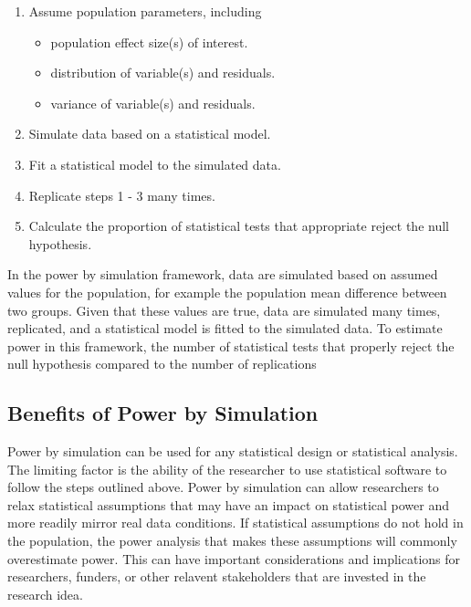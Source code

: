 \documentclass[man]{apa6}
\providecommand{\tightlist}{%
  \setlength{\itemsep}{0pt}\setlength{\parskip}{0pt}}
\begin{document}
\begin{enumerate}
\def\labelenumi{\arabic{enumi}.}
\tightlist
\item
  Assume population parameters, including

  \begin{itemize}
  \tightlist
  \item
    population effect size(s) of interest.
  \item
    distribution of variable(s) and residuals.
  \item
    variance of variable(s) and residuals.
  \end{itemize}
\item
  Simulate data based on a statistical model.
\item
  Fit a statistical model to the simulated data.
\item
  Replicate steps 1 - 3 many times.
\item
  Calculate the proportion of statistical tests that appropriate reject the null hypothesis.
\end{enumerate}

In the power by simulation framework, data are simulated based on assumed values for the population, for example the population mean difference between two groups. Given that these values are true, data are simulated many times, replicated, and a statistical model is fitted to the simulated data. To estimate power in this framework, the number of statistical tests that properly reject the null hypothesis compared to the number of replications

\hypertarget{benefits-of-power-by-simulation}{%
\subsection{Benefits of Power by Simulation}\label{benefits-of-power-by-simulation}}

Power by simulation can be used for any statistical design or statistical analysis. The limiting factor is the ability of the researcher to use statistical software to follow the steps outlined above. Power by simulation can allow researchers to relax statistical assumptions that may have an impact on statistical power and more readily mirror real data conditions. If statistical assumptions do not hold in the population, the power analysis that makes these assumptions will commonly overestimate power. This can have important considerations and implications for researchers, funders, or other relavent stakeholders that are invested in the research idea.
\end{document}
